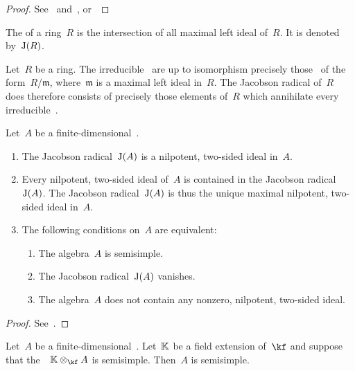 \documentclass[a4paper, 11pt, oneside]{scrartcl}
\begin{document}
\begin{proof}
  See~\cite[XVII,~\S5,~Proposition~4.7]{lang_algebra} and~\cite{stackexchange_lang_proof}, or~\cite[Proposition~5.13]{milne_lag}
\end{proof}

\begin{definition}
  The  of a ring~$R$ is the intersection of all maximal left ideal of~$R$.
  It is denoted by~$\operatorname{J}(R)$.
\end{definition}

\begin{remark}
  Let~$R$ be a ring.
  The irreducible~ are up to isomorphism precisely those~ of the form~$R/\mathfrak{m}$, where~$\mathfrak{m}$ is a maximal left ideal in~$R$.
  The Jacobson radical of~$R$ does therefore consists of precisely those elements of~$R$ which annihilate every irreducible~.
\end{remark}

\begin{proposition}
  Let~$A$ be a finite-dimensional~\algebra{$\kf$}.
  \begin{enumerate}
    \item
      The Jacobson radical~$\operatorname{J}(A)$ is a nilpotent, two-sided ideal in~$A$.
    \item
      Every nilpotent, two-sided ideal of~$A$ is contained in the Jacobson radical~$\operatorname{J}(A)$.
      The Jacobson radical~$\operatorname{J}(A)$ is thus the unique maximal nilpotent, two-sided ideal in~$A$.
    \item
      The following conditions on~$A$ are equivalent:
      \begin{enumerate}[label = \roman*.]
        \item
          The algebra~$A$ is semisimple.
        \item
          The Jacobson radical~$\operatorname{J}(A)$ vanishes.
        \item
          The algebra~$A$ does not contain any nonzero, nilpotent, two-sided ideal.
      \end{enumerate}
  \end{enumerate}
\end{proposition}

\begin{proof}
  See~\cite[\S4]{lam_first_course}.
\end{proof}

\begin{corollary}
  \label{extension of scalars for algebras reflect semisimple}
  Let~$A$ be a finite-dimensional~\algebra{$\kf$}.
  Let~$\Kf$ be a field extension of~$\kf$ and suppose that the~\algebra{$\Kf$}~$\Kf \tensor_{\kf} A$ is semisimple.
  Then~$A$ is semisimple.
\end{corollary}
\end{document}
